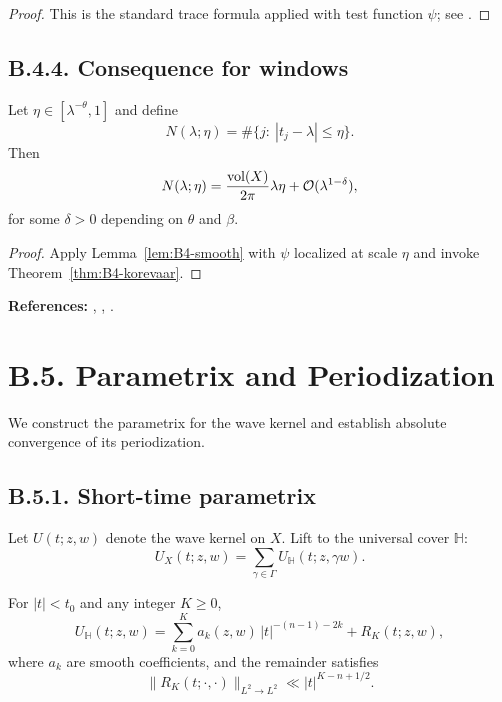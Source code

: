 \begin{proof}
This is the standard trace formula applied with test function $\psi$; see \cite{HejhalI,HejhalII}.
\end{proof}

\subsection*{B.4.4. Consequence for windows}

\begin{proposition}\label{prop:B4-window}
Let $\eta\in[\lambda^{-\theta},1]$ and define
\[
N(\lambda;\eta)=\#\{j:\ |t_j-\lambda|\le \eta\}.
\]
Then
\begin{equation}\label{eq:B4-window}
N(\lambda;\eta)=\frac{\operatorname{vol}(X)}{2\pi}\lambda\eta+\mathcal{O}(\lambda^{1-\delta}),
\end{equation}
for some $\delta>0$ depending on $\theta$ and $\beta$.
\end{proposition}

\begin{proof}
Apply Lemma~\ref{lem:B4-smooth} with $\psi$ localized at scale $\eta$ and invoke Theorem~\ref{thm:B4-korevaar}.
\end{proof}

\medskip
\noindent\textbf{References:} \cite{Korevaar}, \cite{IwaniecKowalski}, \cite{HejhalI,HejhalII}.

\section{B.5. Parametrix and Periodization}\label{sec:B5}

We construct the parametrix for the wave kernel and establish absolute convergence of its periodization.

\subsection*{B.5.1. Short-time parametrix}

Let $U(t;z,w)$ denote the wave kernel on $X$.
Lift to the universal cover $\mathbb{H}$:
\[
U_X(t;z,w)=\sum_{\gamma\in\Gamma} U_{\mathbb{H}}(t;z,\gamma w).
\]

\begin{theorem}\label{thm:B5-param}
For $|t|<t_0$ and any integer $K\ge 0$,
\begin{equation}\label{eq:B5-param}
U_{\mathbb{H}}(t;z,w)=\sum_{k=0}^{K}a_k(z,w)\,|t|^{-(n-1)-2k}
+R_K(t;z,w),
\end{equation}
where $a_k$ are smooth coefficients, and the remainder satisfies
\[
\|R_K(t;\cdot,\cdot)\|_{L^2\to L^2}\ll |t|^{K-n+1/2}.
\]
\end{theorem}

